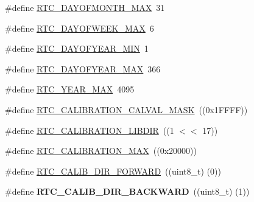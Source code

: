 \begin{DoxyCompactItemize}
\item 
\#define \hyperlink{group___r_t_c__17_x_x__40_x_x_gaddd515ae325f802e35e8202fef5f2957}{R\+T\+C\+\_\+\+D\+A\+Y\+O\+F\+M\+O\+N\+T\+H\+\_\+\+M\+A\+X}~31
\item 
\#define \hyperlink{group___r_t_c__17_x_x__40_x_x_ga83c5c53e8b56ca8d48d9c46d7e8c50fa}{R\+T\+C\+\_\+\+D\+A\+Y\+O\+F\+W\+E\+E\+K\+\_\+\+M\+A\+X}~6
\item 
\#define \hyperlink{group___r_t_c__17_x_x__40_x_x_ga132dcf308a59affe54749f4f11cd22a6}{R\+T\+C\+\_\+\+D\+A\+Y\+O\+F\+Y\+E\+A\+R\+\_\+\+M\+I\+N}~1
\item 
\#define \hyperlink{group___r_t_c__17_x_x__40_x_x_ga2621bb8d69ee212101605c2e3739db4d}{R\+T\+C\+\_\+\+D\+A\+Y\+O\+F\+Y\+E\+A\+R\+\_\+\+M\+A\+X}~366
\item 
\#define \hyperlink{group___r_t_c__17_x_x__40_x_x_ga72b68660aec4a924c12a124e2ec5f852}{R\+T\+C\+\_\+\+Y\+E\+A\+R\+\_\+\+M\+A\+X}~4095
\item 
\#define \hyperlink{group___r_t_c__17_x_x__40_x_x_gafe263620e5d0709ddf51abfdf408c770}{R\+T\+C\+\_\+\+C\+A\+L\+I\+B\+R\+A\+T\+I\+O\+N\+\_\+\+C\+A\+L\+V\+A\+L\+\_\+\+M\+A\+S\+K}~((0x1\+F\+F\+F\+F))
\item 
\#define \hyperlink{group___r_t_c__17_x_x__40_x_x_gae818a2f408ec0a1025ab3f02947d4b84}{R\+T\+C\+\_\+\+C\+A\+L\+I\+B\+R\+A\+T\+I\+O\+N\+\_\+\+L\+I\+B\+D\+I\+R}~((1 $<$$<$ 17))
\item 
\#define \hyperlink{group___r_t_c__17_x_x__40_x_x_gaeb077cfbe5f74f3b15ff72fed96abfe6}{R\+T\+C\+\_\+\+C\+A\+L\+I\+B\+R\+A\+T\+I\+O\+N\+\_\+\+M\+A\+X}~((0x20000))
\item 
\#define \hyperlink{group___r_t_c__17_x_x__40_x_x_ga4f53042ce8b730a4b2c6eb40b856e4e8}{R\+T\+C\+\_\+\+C\+A\+L\+I\+B\+\_\+\+D\+I\+R\+\_\+\+F\+O\+R\+W\+A\+R\+D}~((uint8\+\_\+t) (0))
\item 
\hypertarget{group___r_t_c__17_x_x__40_x_x_ga0a3b0243c2fd9528066365ef74c45cf4}{\#define {\bfseries R\+T\+C\+\_\+\+C\+A\+L\+I\+B\+\_\+\+D\+I\+R\+\_\+\+B\+A\+C\+K\+W\+A\+R\+D}~((uint8\+\_\+t) (1))}\label{group___r_t_c__17_x_x__40_x_x_ga0a3b0243c2fd9528066365ef74c45cf4}

\end{DoxyCompactItemize}
